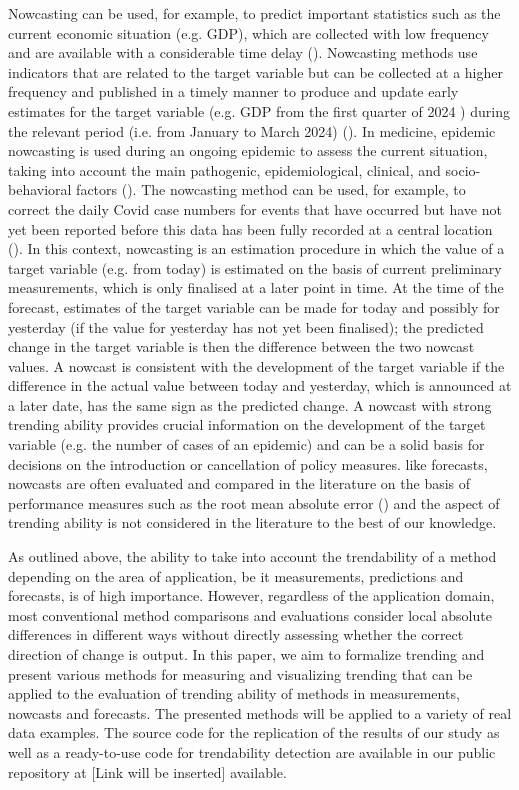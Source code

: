 Nowcasting can be used, for example, to predict important statistics such as the current economic situation (e.g. GDP), which are collected with low frequency and are available with a considerable time delay (\cite{banbura2013now}).
Nowcasting methods use indicators that are related to the target variable but can be collected at a higher frequency and published in a timely manner to produce and update early estimates for the target variable (e.g. GDP from the first quarter of 2024 ) during the relevant period (i.e. from January to March 2024) (\cite{castle2017forecasting}). 
In medicine, epidemic nowcasting is used during an ongoing epidemic to assess the current situation, taking into account the main pathogenic, epidemiological, clinical, and socio-behavioral factors (\cite{wu2021nowcasting}). 
The nowcasting method can be used, for example, to correct the daily Covid case numbers for events that have occurred but have not yet been reported before this data has been fully recorded at a central location (\cite{gunther2021nowcasting}). 
In this context, nowcasting is an estimation procedure in which the value of a target variable (e.g. from today) is estimated on the basis of current preliminary measurements, which is only finalised at a later point in time. 
At the time of the forecast, estimates of the target variable can be made for today and possibly for yesterday (if the value for yesterday has not yet been finalised); the predicted change in the target variable is then the difference between the two nowcast values. 
A nowcast is consistent with the development of the target variable if the difference in the actual value between today and yesterday, which is announced at a later date, has the same sign as the predicted change. 
A nowcast with strong trending ability provides crucial information on the development of the target variable (e.g. the number of cases of an epidemic) and can be a solid basis for decisions on the introduction or cancellation of policy measures. like forecasts, nowcasts are often evaluated and compared in the literature on the basis of performance measures such as the root mean absolute error (\cite{gunther2021nowcasting}) and the aspect of trending ability is not considered in the literature to the best of our knowledge.

As outlined above, the ability to take into account the trendability of a method depending on the area of application, be it measurements, predictions and forecasts, is of high importance. 
However, regardless of the application domain, most conventional method comparisons and evaluations consider local absolute differences in different ways without directly assessing whether the correct direction of change is output. 
In this paper, we aim to formalize trending and present various methods for measuring and visualizing trending that can be applied to the evaluation of trending ability of methods in measurements, nowcasts and forecasts. 
The presented methods will be applied to a variety of real data examples. The source code for the replication of the results of our study as well as a ready-to-use code for trendability detection are available in our public repository at [Link will be inserted] available.

